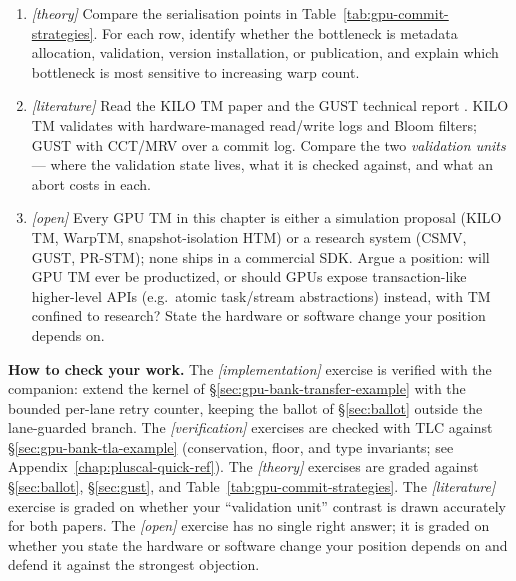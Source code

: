 \begin{enumerate}
\item \emph{[theory]} Compare the serialisation points in Table~\ref{tab:gpu-commit-strategies}. For each row, identify whether the bottleneck is metadata allocation, validation, version installation, or publication, and explain which bottleneck is most sensitive to increasing warp count.

\item \emph{[literature]} Read the KILO TM paper \cite{fung11kilotm} and the
          GUST technical report \cite{nunes23gust}.  KILO TM validates with
          hardware-managed read/write logs and Bloom filters; GUST with
          CCT/MRV over a commit log.  Compare the two \emph{validation
          units} --- where the validation state lives, what it is checked
          against, and what an abort costs in each.

\item \emph{[open]} Every GPU TM in this chapter is either a simulation
          proposal (KILO TM, WarpTM, snapshot-isolation HTM) or a research
          system (CSMV, GUST, PR-STM); none ships in a commercial SDK.
          Argue a position: will GPU TM ever be productized, or should GPUs
          expose transaction-like higher-level APIs (e.g.\ atomic
          task/stream abstractions) instead, with TM confined to research?
          State the hardware or software change your position depends on.
\end{enumerate}

\textbf{How to check your work.} The \emph{[implementation]} exercise is
verified with the companion: extend the kernel of
\S\ref{sec:gpu-bank-transfer-example} with the bounded per-lane retry
counter, keeping the ballot of \S\ref{sec:ballot} outside the lane-guarded
branch.  The \emph{[verification]} exercises are checked with TLC against
\S\ref{sec:gpu-bank-tla-example} (conservation, floor, and type invariants;
see Appendix~\ref{chap:pluscal-quick-ref}).  The \emph{[theory]} exercises
are graded against \S\ref{sec:ballot}, \S\ref{sec:gust}, and
Table~\ref{tab:gpu-commit-strategies}.  The \emph{[literature]} exercise is
graded on whether your ``validation unit'' contrast is drawn accurately
for both papers.  The \emph{[open]} exercise has no single right answer;
it is graded on whether you state the hardware or software change your
position depends on and defend it against the strongest objection.
